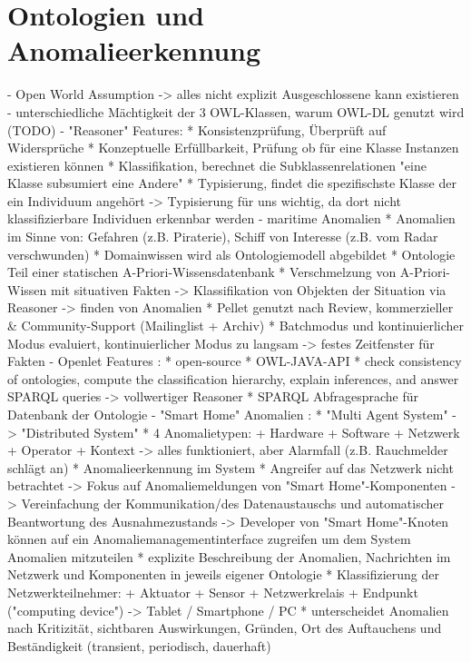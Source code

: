 \section{Ontologien und Anomalieerkennung}
- Open World Assumption -> alles nicht explizit Ausgeschlossene kann existieren
- unterschiedliche Mächtigkeit der 3 OWL-Klassen, warum OWL-DL genutzt wird (TODO)
- "Reasoner" Features: \cite{roy2010exploitation}
	* Konsistenzprüfung, Überprüft auf Widersprüche
	* Konzeptuelle Erfüllbarkeit, Prüfung ob für eine Klasse Instanzen existieren können
	* Klassifikation, berechnet die Subklassenrelationen "eine Klasse subsumiert eine Andere"
	* Typisierung, findet die spezifischste Klasse der ein Individuum angehört
-> Typisierung für uns wichtig, da dort nicht klassifizierbare Individuen erkennbar werden
- maritime Anomalien \cite{roy2010exploitation}
	* Anomalien im Sinne von: Gefahren (z.B. Piraterie), Schiff von Interesse (z.B. vom Radar verschwunden)
	* Domainwissen wird als Ontologiemodell abgebildet
	* Ontologie Teil einer statischen A-Priori-Wissensdatenbank
	* Verschmelzung von A-Priori-Wissen mit situativen Fakten -> Klassifikation von Objekten der Situation via Reasoner -> finden von Anomalien
	* Pellet genutzt nach Review, kommerzieller & Community-Support (Mailinglist + Archiv)
	* Batchmodus und kontinuierlicher Modus evaluiert, kontinuierlicher Modus zu langsam -> festes Zeitfenster für Fakten
- Openlet Features \cite{openlett}:
	* open-source
	* OWL-JAVA-API
	* check consistency of ontologies, compute the classification hierarchy, explain inferences, and answer SPARQL queries -> vollwertiger Reasoner
	* SPARQL Abfragesprache für Datenbank der Ontologie
- "Smart Home" Anomalien \cite{pardo2016framework}:
	* "Multi Agent System" -> "Distributed System"
	* 4 Anomalietypen:
		+ Hardware
		+ Software
		+ Netzwerk
		+ Operator
		+ Kontext -> alles funktioniert, aber Alarmfall (z.B. Rauchmelder schlägt an)
	* Anomalieerkennung im System
	* Angreifer auf das Netzwerk nicht betrachtet -> Fokus auf Anomaliemeldungen von "Smart Home"-Komponenten -> Vereinfachung der Kommunikation/des Datenaustauschs und automatischer Beantwortung des Ausnahmezustands -> Developer von "Smart Home"-Knoten können auf ein Anomaliemanagementinterface zugreifen um dem System Anomalien mitzuteilen
	* explizite Beschreibung der Anomalien, Nachrichten im Netzwerk und Komponenten in jeweils eigener Ontologie
	* Klassifizierung der Netzwerkteilnehmer:
		+ Aktuator
		+ Sensor
		+ Netzwerkrelais
		+ Endpunkt ("computing device") -> Tablet / Smartphone / PC
	* unterscheidet Anomalien nach Kritizität, sichtbaren Auswirkungen, Gründen, Ort des Auftauchens und Beständigkeit (transient, periodisch, dauerhaft)